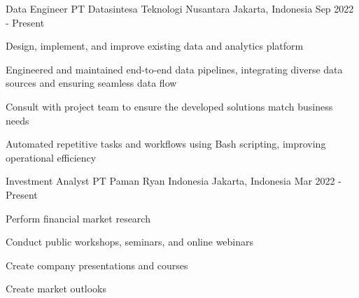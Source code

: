 

\begin{cventries}

  \cventry
    {Data Engineer} %
    {PT Datasintesa Teknologi Nusantara} %
    {Jakarta, Indonesia} %
    {Sep 2022 - Present} %
    {
      \begin{cvitems} %
        \item {Design, implement, and improve existing data and analytics platform}
        \item {Engineered and maintained end-to-end data pipelines, integrating diverse data sources and ensuring seamless data flow}
        \item {Consult with project team to ensure the developed solutions match business needs}
        \item {Automated repetitive tasks and workflows using Bash scripting, improving operational efficiency}
      \end{cvitems}
    }

  \cventry
    {Investment Analyst} %
    {PT Paman Ryan Indonesia} %
    {Jakarta, Indonesia} %
    {Mar 2022 - Present} %
    {
      \begin{cvitems} %
        \item {Perform financial market research}
        \item {Conduct public workshops, seminars, and online webinars}
        \item {Create company presentations and courses}
        \item {Create market outlooks}
      \end{cvitems}
    }


\end{cventries}
